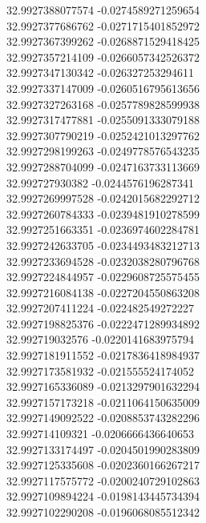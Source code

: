 {32.9927388077574	-0.0274589271259654\\
32.9927377686762	-0.0271715401852972\\
32.9927367399262	-0.0268871529418425\\
32.9927357214109	-0.0266057342526372\\
32.9927347130342	-0.026327253294611\\
32.9927337147009	-0.0260516795613656\\
32.9927327263168	-0.0257789828599938\\
32.9927317477881	-0.0255091333079188\\
32.9927307790219	-0.0252421013297762\\
32.9927298199263	-0.0249778576543235\\
32.9927288704099	-0.0247163733113669\\
32.992727930382	-0.0244576196287341\\
32.9927269997528	-0.0242015682292712\\
32.9927260784333	-0.0239481910278599\\
32.9927251663351	-0.0236974602284781\\
32.9927242633705	-0.0234493483212713\\
32.9927233694528	-0.0232038280796768\\
32.9927224844957	-0.0229608725575455\\
32.9927216084138	-0.0227204550863208\\
32.9927207411224	-0.022482549272227\\
32.9927198825376	-0.0222471289934892\\
32.992719032576	-0.0220141683975794\\
32.9927181911552	-0.0217836418984937\\
32.9927173581932	-0.021555524174052\\
32.9927165336089	-0.0213297901632294\\
32.9927157173218	-0.0211064150635009\\
32.9927149092522	-0.0208853743282296\\
32.992714109321	-0.0206666436640653\\
32.9927133174497	-0.0204501990283809\\
32.9927125335608	-0.0202360166267217\\
32.9927117575772	-0.0200240729102863\\
32.9927109894224	-0.0198143445734394\\
32.9927102290208	-0.0196068085512342\\
}

